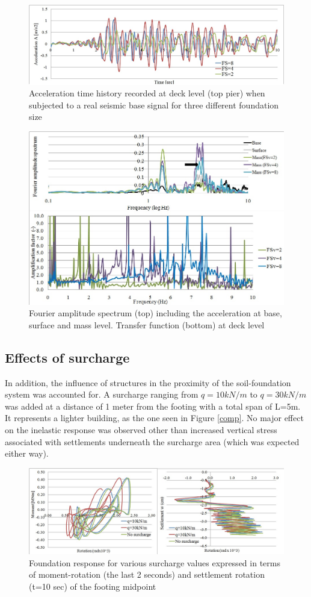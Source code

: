  \begin{figure}[!h]
 	\centering
 	\includegraphics[width=0.6\linewidth]{"acc_2,4,8"}
 	\caption{Acceleration time history recorded at deck level (top pier) when subjected to a real seismic base signal for three different foundation size}
 	\label{eq3}
 \end{figure}

 \begin{figure}[!h]
 	\centering
 	\includegraphics[width=0.6\linewidth]{"fourier_eq"}
 	\caption{Fourier amplitude spectrum (top) including the acceleration at base, surface and mass level. Transfer function (bottom) at deck level}
 	\label{eq4}
 \end{figure}

\newpage
\subsection{Effects of surcharge}
In addition, the influence of structures in the proximity of the soil-foundation system was accounted for. A surcharge ranging from $q=10kN/m$ to $q=30kN/m$ was added at a distance of 1 meter from the footing with a total span of L=5m. It represents a lighter building, as the one seen in Figure \ref{comp}. No major effect on the inelastic response was observed other than increased vertical stress associated with settlements underneath the surcharge area (which was expected either way).

	\begin{figure}[!h]
		\centering
		\includegraphics[width=0.9 \linewidth]{"surcharge2"}
		\caption{Foundation response for various surcharge values expressed in terms of moment-rotation (the last 2 seconds) and settlement rotation (t=10 sec) of the footing midpoint}
		\label{surch}
	\end{figure}

